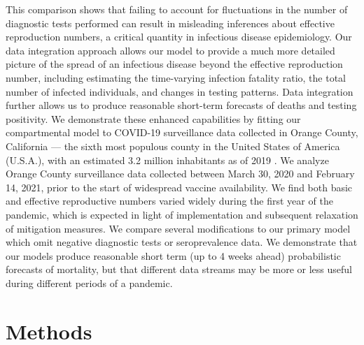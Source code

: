 This comparison shows that failing to account for fluctuations in the number of diagnostic tests performed can result in misleading inferences about effective reproduction numbers, a critical quantity in infectious disease epidemiology.
Our data integration approach allows our model to provide a much more detailed picture of the spread of an infectious disease beyond the effective reproduction number, including estimating the time-varying infection fatality ratio, the total number of infected individuals, and changes in testing patterns.
Data integration further allows us to produce reasonable short-term forecasts of deaths and testing positivity.
We demonstrate these enhanced capabilities
by fitting our compartmental model to COVID-19 surveillance data collected in Orange County, California --- the sixth most populous county in the United States of America (U.S.A.), with an estimated 3.2 million inhabitants as of 2019 \citep{orangecensus}.
We analyze Orange County surveillance data collected between March 30, 2020 and February 14, 2021, prior to the start of widespread vaccine availability.
We find both basic and effective reproductive numbers varied widely during the first year of the pandemic, which is expected in light of implementation and subsequent relaxation of mitigation measures.
We compare several modifications to our primary model which omit negative diagnostic tests or seroprevalence data.
We demonstrate that our models produce reasonable short term (up to 4 weeks ahead) probabilistic forecasts of mortality, but that different data streams may be more or less useful during different periods of a pandemic.

\section{Methods}
\label{ch_4:sec:methods}

